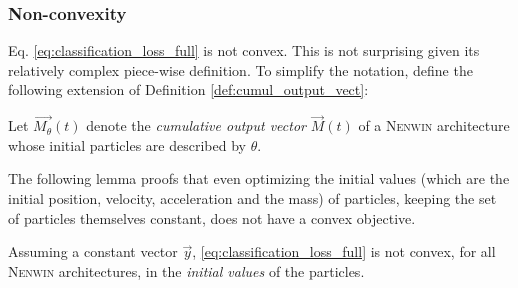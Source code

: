 \subsubsection{Non-convexity}
Eq. \eqref{eq:classification_loss_full} is not convex. This is not surprising given its relatively complex piece-wise definition. To simplify the notation, define the following extension of Definition \ref{def:cumul_output_vect}:

\begin{definition}
    Let $\vec{M_{\theta}}(t)$ denote the \emph{cumulative output vector} $\vec{M}(t)$ of a \textsc{Nenwin} architecture whose initial particles are described by $\theta$.
\end{definition}

The following lemma proofs that even optimizing the initial values (which are the initial position, velocity, acceleration and the mass) of particles, keeping the set of particles themselves constant, does not have a convex objective.
\begin{lemma}
Assuming a constant vector $\vec{y}$, \eqref{eq:classification_loss_full} is not convex, for all \textsc{Nenwin} architectures, in the \emph{initial values} of the particles.
\label{lemma:nonconvexity_loss}
\end{lemma}
